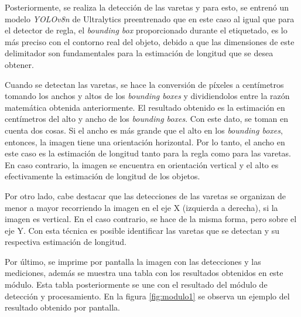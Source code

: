 Posteriormente, se realiza la detección de las varetas y para esto, se entrenó un modelo \textit{YOLOv8n} de Ultralytics preentrenado que en este caso al igual que para el detector de regla, el \textit{bounding box} proporcionado durante el etiquetado, es lo más preciso con el contorno real del objeto, debido a que las dimensiones de este delimitador son fundamentales para la estimación de longitud que se desea obtener. 

Cuando se detectan las varetas, se hace la conversión de píxeles a centímetros tomando los anchos y altos de los \textit{bounding boxes} y dividiendolos entre la razón matemática obtenida anteriormente. El resultado obtenido es la estimación en centímetros del alto y ancho de los \textit{bounding boxes}. Con este dato, se toman en cuenta dos cosas. Si el ancho es más grande que el alto en los \textit{bounding boxes}, entonces, la imagen tiene una orientación horizontal. Por lo tanto, el ancho en este caso es la estimación de longitud tanto para la regla como para las varetas. En caso contrario, la imagen se encuentra en orientación vertical y el alto es efectivamente la estimación de longitud de los objetos.

Por otro lado, cabe destacar que las detecciones de las varetas se organizan de menor a mayor recorriendo la imagen en el eje X (izquierda a derecha), si la imagen es vertical. En el caso contrario, se hace de la misma forma, pero sobre el eje Y. Con esta técnica es posible identificar las varetas que se detectan y su respectiva estimación de longitud.

Por último, se imprime por pantalla la imagen con las detecciones y las mediciones, además se muestra una tabla con los resultados obtenidos en este módulo. Esta tabla posteriormente se une con el resultado del módulo de detección y procesamiento. En la figura \ref{fig:modulo1} se observa un ejemplo del resultado obtenido por pantalla.


